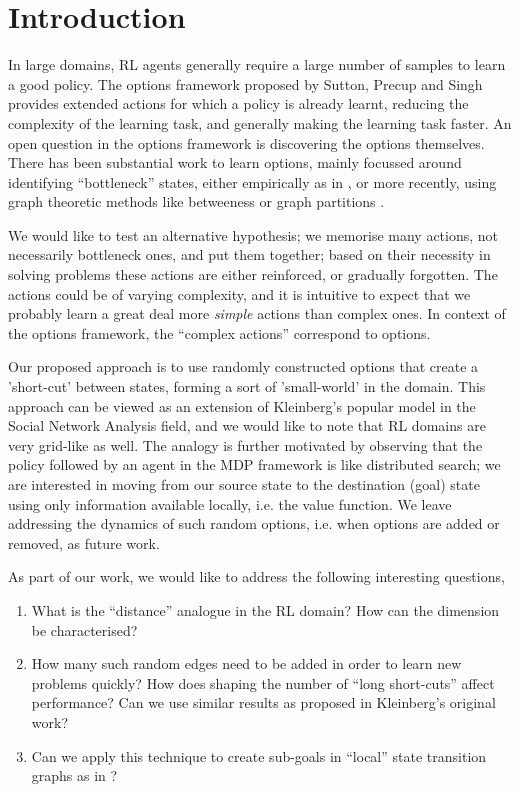 \section{Introduction}
\label{sec:intro}

In large domains, RL agents generally require a large number of samples to
learn a good policy. The options framework proposed by Sutton, Precup and Singh
provides extended actions for which a policy is already learnt, reducing the
complexity of the learning task, and generally making the learning task faster.
An open question in the options framework is discovering the options
themselves.  There has been substantial work to learn options, mainly focussed
around identifying ``bottleneck'' states, either empirically as in \cite{Stolle}, or
more recently, using graph theoretic methods like betweeness \cite{Simsek} or
graph partitions \cite{Simsek2005}.

We would like to test an alternative hypothesis; we memorise many actions,
not necessarily bottleneck ones, and put them together; based on their
necessity in solving problems these actions are either reinforced, or gradually
forgotten.  The actions could be of varying complexity, and it is intuitive to
expect that we probably learn a great deal more {\em simple} actions than
complex ones. In context of the options framework, the ``complex actions''
correspond to options.

Our proposed approach is to use randomly constructed options that create a
'short-cut' between states, forming a sort of 'small-world' in the domain. This
approach can be viewed as an extension of Kleinberg's popular model
\cite{Kleinberg} in the Social Network Analysis field, and we would like to note
that RL domains are very grid-like as well. The analogy is further motivated by
observing that the policy followed by an agent in the MDP framework is like
distributed search; we are interested in moving from our source state to the
destination (goal) state using only information available locally, i.e. the
value function. We leave addressing the dynamics of such random options, i.e.
when options are added or removed, as future work.

As part of our work, we would like to address the following interesting questions,
\begin{enumerate}
\item
    What is the ``distance'' analogue in the RL domain? How can the dimension
    be characterised?
\item
    How many such random edges need to be added in order to learn new problems
    quickly? How does shaping the number of ``long short-cuts'' affect
    performance? Can we use similar results as proposed in Kleinberg's original
    work?
\item
    Can we apply this technique to create sub-goals in ``local'' state transition
    graphs as in \cite{Simsek2005}?
\end{enumerate}

